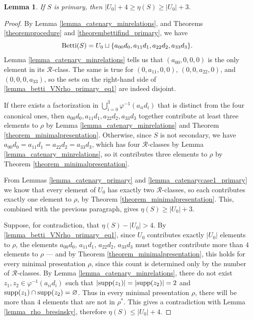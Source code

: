 \documentclass[12pt]{article}
\newtheorem{lemma}[thm]{Lemma}
\theoremstyle{remark}
\begin{document}
\begin{lemma}\label{lemma_betti_VNrho_primary}
     If $S$ is primary, then $|U_0| + 4 \geq  \eta(S) \geq |U_0| +3 $. 
\end{lemma}
\begin{proof}
    By Lemma \ref{lemma_catenary_minrelations}, and Theorems \ref{theoremprocedure} and \ref{theorembettifind_primary}, we have
    \begin{equation}\label{lemma_betti_VNrho_primary_eq1}
        \textup{Betti}(S) = U_0 \sqcup \{a_{00}d_0, a_{11}d_1, a_{22}d_2, a_{33}d_3\}. 
    \end{equation}
    Lemma \ref{lemma_catenary_minrelations} tells us that $(a_{00},0,0,0)$ is the only element in its $\mathcal{R}$-class. The same is true for $(0,a_{11},0,0)$, $(0,0,a_{22},0)$, and $(0,0,0,a_{33})$, so the sets on the right-hand side
    of \eqref{lemma_betti_VNrho_primary_eq1} are indeed disjoint. 
    
    If there exists a factorization in $\bigcup_{i=0}^3 \varphi^{-1}(a_{ii}d_i)$ that is distinct from the four canonical ones, then $a_{00}d_0, a_{11}d_1, a_{22}d_2, a_{33}d_3$ together contribute at least three elements to $\rho$ by Lemma \ref{lemma_catenary_minrelations} and Theorem \ref{theorem_minimalpresentation}. Otherwise, since $S$ is not secondary, we have $a_{00}d_0= a_{11}d_1= a_{22}d_2= a_{33}d_3$, which has four $\mathcal{R}$-classes by Lemma \ref{lemma_catenary_minrelations}, so it contributes three elements to $\rho$ by Theorem \ref{theorem_minimalpresentation}.    
    
    
    From Lemmas \ref{lemma_catenary_primary} and \ref{lemma_catenarycase1_primary} we know that every element of $U_0$ has exactly two $\mathcal{R}$-classes, so each contributes exactly one element to $\rho$, by Theorem \ref{theorem_minimalpresentation}. This, combined with the previous paragraph, gives $\eta(S) \geq |U_0| + 3$. 

    Suppose, for contradiction, that $\eta(S) - |U_0| > 4$. By \eqref{lemma_betti_VNrho_primary_eq1}, since $U_0$ contributes exactly $|U_0|$ elements to $\rho$, the elements $a_{00}d_0$, $a_{11}d_1$, $a_{22}d_2$, $a_{33}d_3$ must together contribute more than $4$ elements to $\rho$ --- and by Theorem \ref{theorem_minimalpresentation}, this holds for every minimal presentation $\rho$, since this count is determined only by the number of $\mathcal{R}$-classes. 
    By Lemma \ref{lemma_catenary_minrelations}, there do not exist $z_1,z_2 \in \varphi^{-1}(a_{ii}d_i)$ such that $|\textup{supp}(z_1)| = |\textup{supp}(z_2)| = 2$ and $\textup{supp}(z_1) \cap \textup{supp}(z_2) = \varnothing$. Thus in every minimal presentation $\rho$, there will be more than $4$ elements that are not in $\rho^*$. This gives a contradiction with Lemma \ref{lemma_rho_bresinsky}, therefore $\eta(S) \leq |U_0| + 4 $.
\end{proof}
\end{document}
